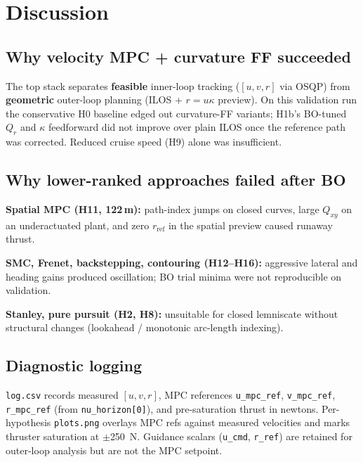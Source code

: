 \documentclass[11pt,a4paper]{article}
\begin{document}
\section{Discussion}
\label{sec:discussion}

\subsection{Why velocity MPC + curvature FF succeeded}

The top stack separates \textbf{feasible} inner-loop tracking ($[u,v,r]$ via OSQP) from
\textbf{geometric} outer-loop planning (ILOS + $r=u\kappa$ preview). On this validation run the
conservative H0 baseline edged out curvature-FF variants; H1b's BO-tuned $Q_r$ and
$\kappa$ feedforward did not improve over plain ILOS once the reference path was corrected.
Reduced cruise speed (H9) alone was insufficient.

\subsection{Why lower-ranked approaches failed after BO}

\textbf{Spatial MPC (H11, 122\,m):} path-index jumps on closed curves, large $Q_{xy}$ on an
underactuated plant, and zero $r_{\mathrm{ref}}$ in the spatial preview caused runaway thrust.

\textbf{SMC, Frenet, backstepping, contouring (H12--H16):} aggressive lateral and heading
gains produced oscillation; BO trial minima were not reproducible on validation.

\textbf{Stanley, pure pursuit (H2, H8):} unsuitable for closed lemniscate without structural
changes (lookahead / monotonic arc-length indexing).

\subsection{Diagnostic logging}

\texttt{log.csv} records measured $[u,v,r]$, MPC references
\texttt{u\_mpc\_ref}, \texttt{v\_mpc\_ref}, \texttt{r\_mpc\_ref} (from
\texttt{nu\_horizon[0]}), and pre-saturation thrust in newtons. Per-hypothesis
\texttt{plots.png} overlays MPC refs against measured velocities and marks thruster
saturation at $\pm$\SI{250}{\newton}. Guidance scalars (\texttt{u\_cmd}, \texttt{r\_ref}) are
retained for outer-loop analysis but are not the MPC setpoint.
\end{document}
